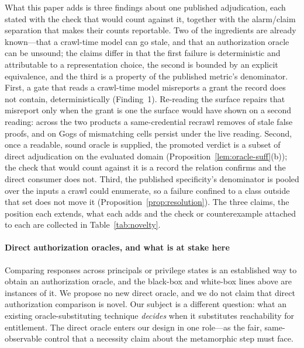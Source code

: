 What this paper adds is three findings about one published adjudication, each stated with
the check that would count against it, together with the alarm/claim separation that makes
their counts reportable. Two of the ingredients are already known---that a
crawl-time model can go stale, and that an authorization oracle can be unsound; the
claims differ in that the first failure is deterministic and attributable to a
representation choice, the second is bounded by an explicit equivalence, and the third is
a property of the published metric's denominator. First, a gate that reads a crawl-time
model misreports a grant the record does not contain, deterministically (Finding~1).
Re-reading the surface repairs that misreport only when the grant is one the surface would
have shown on a second reading: across the two products a same-credential recrawl removes
\TmpBothFixed{} of \TmpBothStaleFP{} stale false proofs, and on Gogs \GgMismatchLive{} of
\GgMismatchSnap{} mismatching cells persist under the live reading. Second, once a
readable, sound oracle is supplied, the promoted verdict is a subset of direct
adjudication on the evaluated domain (Proposition~\ref{lem:oracle-suff}(b)); the check
that would count against it is a record the relation confirms and the direct consumer does
not. Third, the published specificity's denominator is pooled over the inputs a crawl could
enumerate, so a failure confined to a class outside that set does not move it
(Proposition~\ref{prop:resolution}). The three claims, the position each extends, what each
adds and the check or counterexample attached to each are collected in
Table~\ref{tab:novelty}.



\paragraph{Direct authorization oracles, and what is at stake here} Comparing
responses across principals or privilege states is an established way to obtain an
authorization oracle, and the black-box and white-box lines above are instances of
it. We propose no new direct oracle, and we do not claim that direct authorization
comparison is novel. Our subject is a different question: what an existing
oracle-substituting technique \emph{decides} when it substitutes reachability for
entitlement. The direct oracle enters our design in one role---as the fair,
same-observable control that a necessity claim about the metamorphic step must face.

